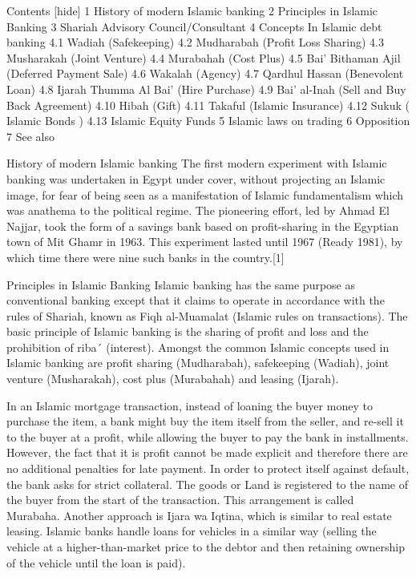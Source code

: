 Contents [hide]
1 History of modern Islamic banking 
2 Principles in Islamic Banking 
3 Shariah Advisory Council/Consultant 
4 Concepts In Islamic debt banking 
4.1 Wadiah (Safekeeping) 
4.2 Mudharabah (Profit Loss Sharing) 
4.3 Musharakah (Joint Venture) 
4.4 Murabahah (Cost Plus) 
4.5 Bai' Bithaman Ajil (Deferred Payment Sale) 
4.6 Wakalah (Agency) 
4.7 Qardhul Hassan (Benevolent Loan) 
4.8 Ijarah Thumma Al Bai' (Hire Purchase) 
4.9 Bai' al-Inah (Sell and Buy Back Agreement) 
4.10 Hibah (Gift) 
4.11 Takaful (Islamic Insurance) 
4.12 Sukuk ( Islamic Bonds ) 
4.13 Islamic Equity Funds 
5 Islamic laws on trading 
6 Opposition 
7 See also 

History of modern Islamic banking
The first modern experiment with Islamic banking was undertaken in Egypt under cover, without projecting an Islamic image, for fear of being seen as a manifestation of Islamic fundamentalism which was anathema to the political regime. The pioneering effort, led by Ahmad El Najjar, took the form of a savings bank based on profit-sharing in the Egyptian town of Mit Ghamr in 1963. This experiment lasted until 1967 (Ready 1981), by which time there were nine such banks in the country.[1]


Principles in Islamic Banking
Islamic banking has the same purpose as conventional banking except that it claims to operate in accordance with the rules of Shariah, known as Fiqh al-Muamalat (Islamic rules on transactions). The basic principle of Islamic banking is the sharing of profit and loss and the prohibition of riba´ (interest). Amongst the common Islamic concepts used in Islamic banking are profit sharing (Mudharabah), safekeeping (Wadiah), joint venture (Musharakah), cost plus (Murabahah) and leasing (Ijarah).

In an Islamic mortgage transaction, instead of loaning the buyer money to purchase the item, a bank might buy the item itself from the seller, and re-sell it to the buyer at a profit, while allowing the buyer to pay the bank in installments. However, the fact that it is profit cannot be made explicit and therefore there are no additional penalties for late payment. In order to protect itself against default, the bank asks for strict collateral. The goods or Land is registered to the name of the buyer from the start of the transaction. This arrangement is called Murabaha. Another approach is Ijara wa Iqtina, which is similar to real estate leasing. Islamic banks handle loans for vehicles in a similar way (selling the vehicle at a higher-than-market price to the debtor and then retaining ownership of the vehicle until the loan is paid).

